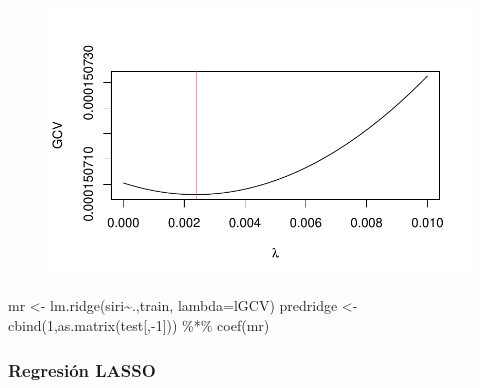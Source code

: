 \documentclass[
  letterpaper,
  DIV=11,
  numbers=noendperiod]{scrartcl}
\newenvironment{Shaded}{\begin{snugshade}}{\end{snugshade}}
\newcommand{\AttributeTok}[1]{\textcolor[rgb]{0.40,0.45,0.13}{#1}}
\newcommand{\DecValTok}[1]{\textcolor[rgb]{0.68,0.00,0.00}{#1}}
\newcommand{\FunctionTok}[1]{\textcolor[rgb]{0.28,0.35,0.67}{#1}}
\newcommand{\NormalTok}[1]{\textcolor[rgb]{0.00,0.23,0.31}{#1}}
\newcommand{\OtherTok}[1]{\textcolor[rgb]{0.00,0.23,0.31}{#1}}
\newcommand{\SpecialCharTok}[1]{\textcolor[rgb]{0.37,0.37,0.37}{#1}}
\newcommand{\StringTok}[1]{\textcolor[rgb]{0.13,0.47,0.30}{#1}}
\begin{document}
\begin{Shaded}
\end{Shaded}

\begin{figure}[H]

{\centering \includegraphics{Regularizacion_files/figure-pdf/unnamed-chunk-17-1.pdf}

}

\end{figure}

\begin{Shaded}
\begin{Highlighting}[]
\NormalTok{ mr }\OtherTok{\textless{}{-}} \FunctionTok{lm.ridge}\NormalTok{(siri}\SpecialCharTok{\textasciitilde{}}\NormalTok{.,train, }\AttributeTok{lambda=}\NormalTok{lGCV)}
\NormalTok{ predridge }\OtherTok{\textless{}{-}} \FunctionTok{cbind}\NormalTok{(}\DecValTok{1}\NormalTok{,}\FunctionTok{as.matrix}\NormalTok{(test[,}\SpecialCharTok{{-}}\DecValTok{1}\NormalTok{])) }\SpecialCharTok{\%*\%} \FunctionTok{coef}\NormalTok{(mr)}
\end{Highlighting}
\end{Shaded}

\hypertarget{regresiuxf3n-lasso}{%
\subsubsection{Regresión LASSO}\label{regresiuxf3n-lasso}}
\end{document}
